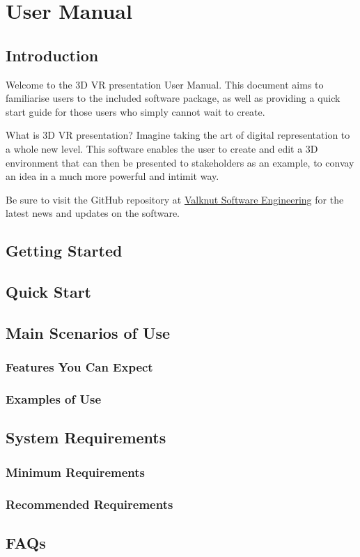 
\section{User Manual}

	\subsection{Introduction}
	
	Welcome to the 3D VR presentation User Manual.  This document aims to familiarise users to the included software package, as well as providing a quick start guide for those users who simply cannot wait to create.  
	
	What is 3D VR presentation?  Imagine taking the art of digital representation to a whole new level.  This software enables the user to create and edit a 3D environment that can then be presented to stakeholders as an example, to convay an idea in a much more powerful and intimit way.  
	
	Be sure to visit the GitHub repository at 
	\href{https://github.com/Valknut-Software-Engineering/Capstone_Project}{Valknut Software Engineering}
	for the latest news and updates on the software.  
	
	\subsection{Getting Started}
	
	\subsection{Quick Start}
	
	\subsection{Main Scenarios of Use}
		
		\subsubsection{Features You Can Expect}
		
		\subsubsection{Examples of Use}
	
	\subsection{System Requirements}
		
		\subsubsection{Minimum Requirements}
		
		\subsubsection{Recommended Requirements}
	
	\subsection{FAQs}